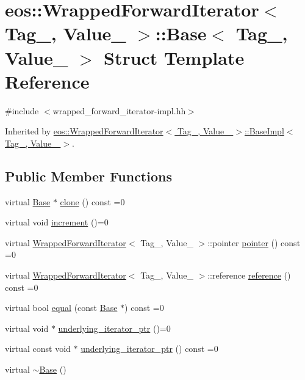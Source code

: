 \hypertarget{structeos_1_1WrappedForwardIterator_1_1Base}{
\section{eos::WrappedForwardIterator$<$ Tag\_\-, Value\_\- $>$::Base$<$ Tag\_\-, Value\_\- $>$ Struct Template Reference}
\label{structeos_1_1WrappedForwardIterator_1_1Base}
}


{\ttfamily \#include $<$wrapped\_\-forward\_\-iterator-\/impl.hh$>$}

Inherited by \hyperlink{structeos_1_1WrappedForwardIterator_1_1BaseImpl}{eos::WrappedForwardIterator$<$ Tag\_\-, Value\_\- $>$::BaseImpl$<$ Tag\_\-, Value\_\- $>$}.\subsection*{Public Member Functions}
\begin{DoxyCompactItemize}
\item 
virtual \hyperlink{structeos_1_1WrappedForwardIterator_1_1Base}{Base} $\ast$ \hyperlink{structeos_1_1WrappedForwardIterator_1_1Base_a146a4e18680684f22bb7ca73f662718d}{clone} () const =0
\item 
virtual void \hyperlink{structeos_1_1WrappedForwardIterator_1_1Base_a7ab151df86128ddc4e98c64211829544}{increment} ()=0
\item 
virtual \hyperlink{classeos_1_1WrappedForwardIterator}{WrappedForwardIterator}$<$ Tag\_\-, Value\_\- $>$::pointer \hyperlink{structeos_1_1WrappedForwardIterator_1_1Base_a3e63d544a83f5324f323f0d04c2203a3}{pointer} () const =0
\item 
virtual \hyperlink{classeos_1_1WrappedForwardIterator}{WrappedForwardIterator}$<$ Tag\_\-, Value\_\- $>$::reference \hyperlink{structeos_1_1WrappedForwardIterator_1_1Base_a1cffbfbcead34d38a7390173496d70df}{reference} () const =0
\item 
virtual bool \hyperlink{structeos_1_1WrappedForwardIterator_1_1Base_a4ec070b72367be2f7f52babe05c1f9bc}{equal} (const \hyperlink{structeos_1_1WrappedForwardIterator_1_1Base}{Base} $\ast$) const =0
\item 
virtual void $\ast$ \hyperlink{structeos_1_1WrappedForwardIterator_1_1Base_a6f51dc38ebf16d338c4d14421a3a98e1}{underlying\_\-iterator\_\-ptr} ()=0
\item 
virtual const void $\ast$ \hyperlink{structeos_1_1WrappedForwardIterator_1_1Base_a788fdefd6b028b601e7e56c367a5f864}{underlying\_\-iterator\_\-ptr} () const =0
\item 
virtual \hyperlink{structeos_1_1WrappedForwardIterator_1_1Base_a4d6dc901016516de2f269abb38446c22}{$\sim$Base} ()
\end{DoxyCompactItemize}
